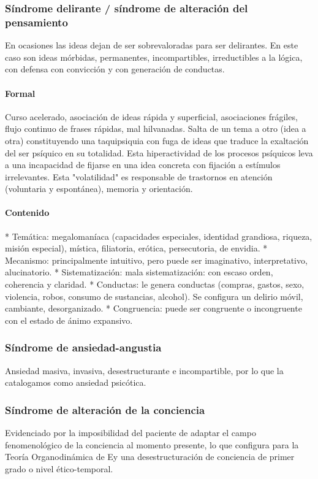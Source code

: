 \documentclass{scrbook}
\begin{document}
\subsubsection*{Síndrome delirante / síndrome de alteración del pensamiento}
En ocasiones las ideas dejan de ser sobrevaloradas para ser delirantes. En este caso son ideas mórbidas, permanentes, incompartibles, irreductibles a la lógica, con defensa con convicción y con generación de conductas.
\paragraph{Formal}
Curso acelerado, asociación de ideas rápida y superficial, asociaciones frágiles, flujo continuo de frases rápidas, mal hilvanadas. Salta de un tema a otro (idea a otra) constituyendo una taquipsiquia con fuga de ideas que traduce la exaltación del ser psíquico en su totalidad. Esta hiperactividad de los procesos psíquicos leva a una incapacidad de fijarse en una idea concreta con fijación a estímulos irrelevantes. Esta "volatilidad" es responsable de trastornos en atención (voluntaria y espontánea), memoria y orientación.
\paragraph{Contenido}
* Temática: megalomaníaca (capacidades especiales, identidad grandiosa, riqueza, misión especial), mística, filiatoria, erótica, persecutoria, de envidia.
* Mecanismo: principalmente intuitivo, pero puede ser imaginativo, interpretativo, alucinatorio.
* Sistematización: mala sistematización: con escaso orden, coherencia y claridad.
* Conductas: le genera conductas (compras, gastos, sexo, violencia, robos, consumo de sustancias, alcohol). Se configura un delirio móvil, cambiante, desorganizado.
* Congruencia: puede ser congruente o incongruente con el estado de ánimo expansivo.
\subsubsection*{Síndrome de ansiedad-angustia}
Ansiedad masiva, invasiva, desestructurante e incompartible, por lo que la catalogamos como ansiedad psicótica.
\subsubsection*{Síndrome de alteración de la conciencia}
Evidenciado por la imposibilidad del paciente de adaptar el campo fenomenológico de la conciencia al momento presente, lo que configura para la Teoría Organodinámica de Ey una desestructuración de conciencia de primer grado o nivel ético-temporal.
\end{document}
